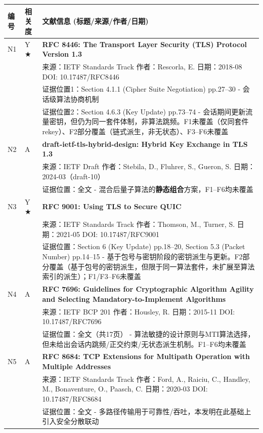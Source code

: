\documentclass[12pt,a4paper]{article}
\begin{document}
\begin{longtable}{|p{1.2cm}|p{1.8cm}|p{11.6cm}|}
\hline
\textbf{编号} & \textbf{相关度} & \textbf{文献信息 (标题/来源/作者/日期)} \\
\hline

N1 & Y ★ & \textbf{RFC 8446: The Transport Layer Security (TLS) Protocol Version 1.3} \\
& & 来源：IETF Standards Track \quad 作者：Rescorla, E. \quad 日期：2018-08 \quad DOI: 10.17487/RFC8446 \\
& & 证据位置1：Section 4.1.1 (Cipher Suite Negotiation) pp.27--30 - 会话级算法协商机制 \\
& & 证据位置2：Section 4.6.3 (Key Update) pp.73--74 - 会话期间更新流量密钥，但仍为同一套件体制，非算法跳频。F1未覆盖（仅同套件rekey）、F2部分覆盖（链式派生，非无状态）、F3--F6未覆盖 \\
\hline
N2 & A & \textbf{draft-ietf-tls-hybrid-design: Hybrid Key Exchange in TLS 1.3} \\
& & 来源：IETF Draft \quad 作者：Stebila, D., Fluhrer, S., Gueron, S. \quad 日期：2024-03（draft-10） \\
& & 证据位置：全文 - 混合后量子算法的\textbf{静态组合}方案，F1--F6均未覆盖 \\
\hline
N3 & Y ★ & \textbf{RFC 9001: Using TLS to Secure QUIC} \\
& & 来源：IETF Standards Track \quad 作者：Thomson, M., Turner, S. \quad 日期：2021-05 \quad DOI: 10.17487/RFC9001 \\
& & 证据位置：Section 6 (Key Update) pp.18--20, Section 5.3 (Packet Number) pp.14--15 - 基于包号与密钥阶段的密钥派生与更新。F2部分覆盖（基于包号的密钥派生，但限于同一算法套件，未扩展至算法索引的派生）；F1/F3--F6未覆盖 \\
\hline
N4 & A & \textbf{RFC 7696: Guidelines for Cryptographic Algorithm Agility and Selecting Mandatory-to-Implement Algorithms} \\
& & 来源：IETF BCP 201 \quad 作者：Housley, R. \quad 日期：2015-11 \quad DOI: 10.17487/RFC7696 \\
& & 证据位置：全文（共17页） - 算法敏捷的设计原则与MTI算法选择，但未给出会话内跳频/正交约束/无状态派生机制。F1--F6均未覆盖 \\
\hline
N5 & A & \textbf{RFC 8684: TCP Extensions for Multipath Operation with Multiple Addresses} \\
& & 来源：IETF Standards Track \quad 作者：Ford, A., Raiciu, C., Handley, M., Bonaventure, O., Paasch, C. \quad 日期：2020-03 \quad DOI: 10.17487/RFC8684 \\
& & 证据位置：全文 - 多路径传输用于可靠性/吞吐，本发明在此基础上引入安全分散联动 \\
\hline

\end{longtable}
\end{document}
